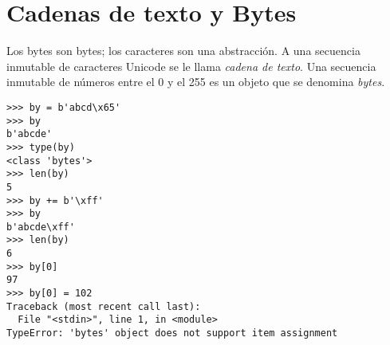 \section{Cadenas de texto y Bytes}

Los bytes son bytes; los caracteres son una abstracción. A una secuencia inmutable de caracteres Unicode se le llama \emph{cadena de texto}. Una secuencia inmutable de números entre el 0 y el 255 es un objeto que se denomina \emph{bytes}.

\noindent\begin{minipage}{\textwidth}
\begin{lstlisting}[mathescape=True]
>>> by = b'abcd\x65'
>>> by
b'abcde'
>>> type(by)
<class 'bytes'>
>>> len(by)
5
>>> by += b'\xff'
>>> by
b'abcde\xff'
>>> len(by)
6
>>> by[0]
97
>>> by[0] = 102
Traceback (most recent call last):
  File "<stdin>", line 1, in <module>
TypeError: 'bytes' object does not support item assignment
\end{lstlisting}
\end{minipage}

